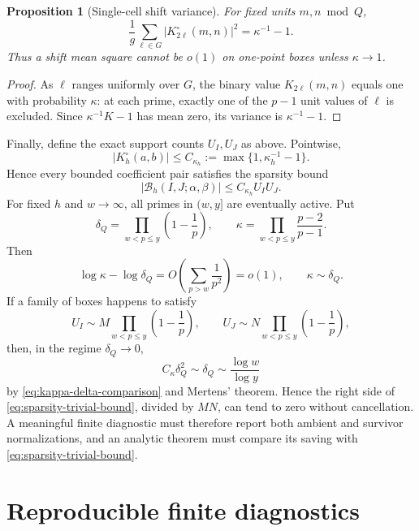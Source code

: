 \documentclass[11pt]{article}
\newtheorem{proposition}[theorem]{Proposition}
\theoremstyle{definition}
\theoremstyle{remark}
\newcommand{\cB}{\mathcal B}
\begin{document}
\begin{proposition}[Single-cell shift variance]\label{prop:single-cell-variance}
For fixed units $m,n\bmod Q$,
\begin{equation}\label{eq:single-cell-variance}
 \frac1g\sum_{\ell\in G}|K_{2\ell}^\circ(m,n)|^2
 =\kappa^{-1}-1.
\end{equation}
Thus a shift mean square cannot be $o(1)$ on one-point boxes unless $\kappa\to1$.
\end{proposition}

\begin{proof}
As $\ell$ ranges uniformly over $G$, the binary value $K_{2\ell}(m,n)$ equals one with probability $\kappa$: at each prime, exactly one of the $p-1$ unit values of $\ell$ is excluded.  Since $\kappa^{-1}K-1$ has mean zero, its variance is $\kappa^{-1}-1$.
\end{proof}

Finally, define the exact support counts $U_I,U_J$ as above.  Pointwise,
\begin{equation}\label{eq:pointwise-kernel-bound}
 |K_h^\circ(a,b)|
 \le C_{\kappa_h}:=\max\{1,\kappa_h^{-1}-1\}.
\end{equation}
Hence every bounded coefficient pair satisfies the sparsity bound
\begin{equation}\label{eq:sparsity-trivial-bound}
 |\cB_h(I,J;\alpha,\beta)|
 \le C_{\kappa_h}U_IU_J.
\end{equation}
For fixed $h$ and $w\to\infty$, all primes in $(w,y]$ are eventually active.  Put
\[
 \delta_Q=\prod_{w<p\le y}\left(1-\frac1p\right),
 \qquad
 \kappa=\prod_{w<p\le y}\frac{p-2}{p-1}.
\]
Then
\begin{equation}\label{eq:kappa-delta-comparison}
 \log\kappa-\log\delta_Q
 =O\left(\sum_{p>w}\frac1{p^2}\right)=o(1),
 \qquad \kappa\sim\delta_Q.
\end{equation}
If a family of boxes happens to satisfy
\[
 U_I\sim M\prod_{w<p\le y}\left(1-\frac1p\right),
 \qquad
 U_J\sim N\prod_{w<p\le y}\left(1-\frac1p\right),
\]
then, in the regime $\delta_Q\to0$,
\[
 C_\kappa\delta_Q^2\sim\delta_Q
 \sim\frac{\log w}{\log y}
\]
by \eqref{eq:kappa-delta-comparison} and Mertens' theorem.  Hence the right side of \eqref{eq:sparsity-trivial-bound}, divided by $MN$, can tend to zero without cancellation.  A meaningful finite diagnostic must therefore report both ambient and survivor normalizations, and an analytic theorem must compare its saving with \eqref{eq:sparsity-trivial-bound}.

\section{Reproducible finite diagnostics}\label{sec:experiments}
\end{document}
